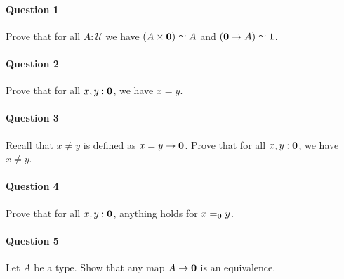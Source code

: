 \documentclass{article}[6pt]%
\newcommand{\U}{{\mathcal U}}
\renewcommand{\r}{\rightarrow}
\newcommand{\one}{{\bf 1}}
\newcommand{\zero}{{\bf 0}}
\begin{document}
\begin{Exercise}[title={The empty type}]

\paragraph{Question 1} Prove that for all $A:\U$ we have $(A\times \zero) \simeq A$ and $(\zero\r A)\simeq \one$.

\paragraph{Question 2} Prove that for all $x,y:\zero$, we have $x=y$.


\paragraph{Question 3} Recall that $x\neq y$ is defined as $x=y\r \zero$. Prove that for all $x,y:\zero$, we have $x\neq y$.

\paragraph{Question 4} Prove that for all $x,y:\zero$, anything holds for $x=_\zero y$.

\paragraph{Question 5} Let $A$ be a type. Show that any map $A\r \zero$ is an equivalence.


\end{Exercise}
\end{document}
